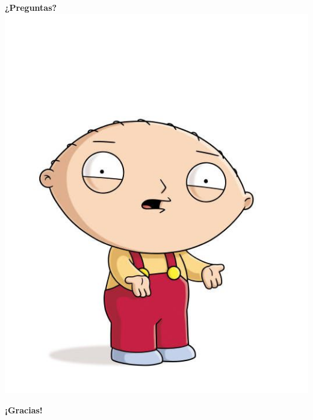 \documentclass{beamer}
\begin{document}
\begin{frame}
    \begin{center}
        \LARGE\textbf{¿Preguntas?} \\
        \vspace{3mm}
        \includegraphics[scale=0.2]{fig/preguntas.jpg}
    \end{center}
\end{frame}

\begin{frame}
    \begin{center}
        \huge\textbf{¡Gracias!}
    \end{center}
\end{frame}
\end{document}
